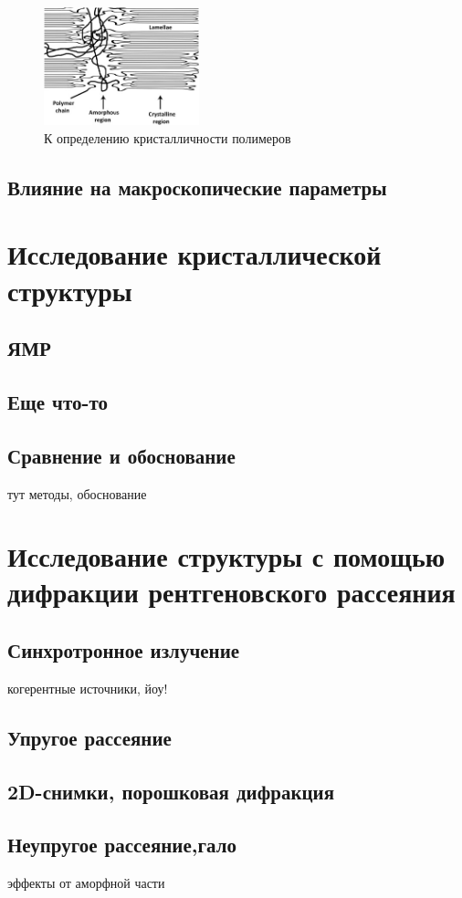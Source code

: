 	
	\begin{figure} 
\vspace{-20pt}
  \begin{center}
    \includegraphics[width=0.4\textwidth]{fig/crystal-2.jpg}
    \caption{К определению кристалличности полимеров}
    \label{fig:crystal-2}
  \end{center}
  \vspace{-20pt}
  \vspace{1pt}
\end{figure}	

\subsection{Влияние на макроскопические параметры}

\section{Исследование кристаллической структуры}
\subsection{ЯМР}
\subsection{Еще что-то}
\subsection{Сравнение и обоснование}
тут методы, обоснование

\section{Исследование структуры с помощью дифракции рентгеновского рассеяния}

\subsection{Синхротронное излучение}
когерентные источники, йоу!
\subsection{Упругое рассеяние}
\subsection{2D-снимки, порошковая дифракция}
\subsection{Неупругое рассеяние,гало}
эффекты от аморфной части



	